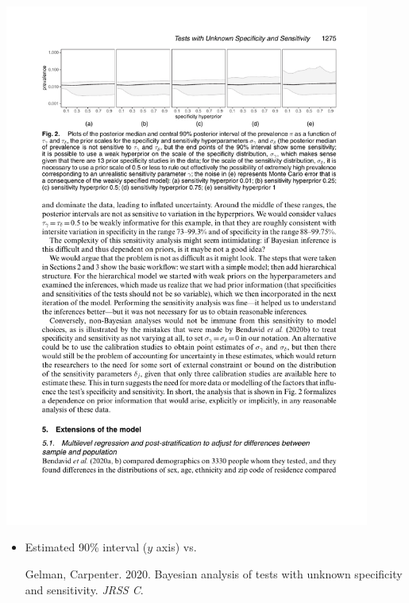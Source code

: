 \documentclass[10pt]{report}
\begin{document}
\spc{} 
\\[-8pt]
\begin{center}
\vspace*{-10pt}
\includegraphics[width=0.9\textwidth]{img/covid-sensitivity.pdf}
\vspace*{-10pt}
\end{center}
\begin{itemize}
\item Estimated  90\% interval ($y$ axis) vs.
\vfill
{\footnotesize
Gelman, Carpenter. 2020. Bayesian analysis of tests with unknown
specificity and sensitivity. \textit{JRSS C}.}
\end{itemize}
\end{document}
